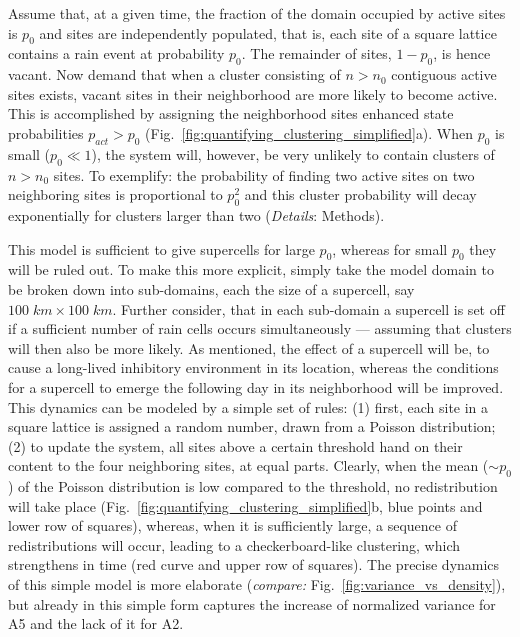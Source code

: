 \documentclass[draft,linenumbers]{agujournal2019}
\begin{document}
Assume that, at a given time, the fraction of the domain occupied by active sites is $p_0$ and sites are independently populated, that is, each site of a square lattice contains a rain event at probability $p_0$.
The remainder of sites, $1-p_0$, is hence vacant.
Now demand that when a cluster consisting of $n>n_0$ contiguous active sites exists, vacant sites in their neighborhood are more likely to become active. 
This is accomplished by assigning the neighborhood sites enhanced state probabilities $p_{act}>p_0$
(Fig.~\ref{fig:quantifying_clustering_simplified}a).
When $p_0$ is small ($p_0\ll 1$), the system will, however, be very unlikely to contain clusters of $n>n_0$ sites.
To exemplify: the probability of finding two active sites on two neighboring sites is proportional to $p_0^2$ and this cluster probability will decay exponentially for clusters larger than two ({\it Details}: Methods).

This model is sufficient to give supercells for large $p_0$, whereas for small $p_0$ they will be ruled out.
To make this more explicit, simply take the model domain to be broken down into sub-domains, each the size of a supercell, say $100\;km\times 100\;km$.
Further consider, that in each sub-domain a supercell is set off if a sufficient number of rain cells occurs simultaneously --- assuming that clusters will then also be more likely.
As mentioned, the effect of a supercell will be, to cause a long-lived inhibitory environment in its location, whereas the conditions for a supercell to emerge the following day in its neighborhood will be improved. 
This dynamics can be modeled by a simple set of rules: 
(1) first, each site in a square lattice is assigned a random number, drawn from a Poisson distribution; 
(2) to update the system, all sites above a certain threshold hand on their content to the four neighboring sites, at equal parts. 
Clearly, when the mean ($\sim p_0$) of the Poisson distribution is low compared to the threshold, no redistribution will take place (Fig.~\ref{fig:quantifying_clustering_simplified}b, blue points and lower row of squares), whereas, when it is sufficiently large, a sequence of redistributions will occur, leading to a checkerboard-like clustering, which strengthens in time (red curve and upper row of squares).
The precise dynamics of this simple model is more elaborate ({\it compare:} Fig.~\ref{fig:variance_vs_density}), but already in this simple form captures the increase of normalized variance for A5 and the lack of it for A2.
\end{document}
